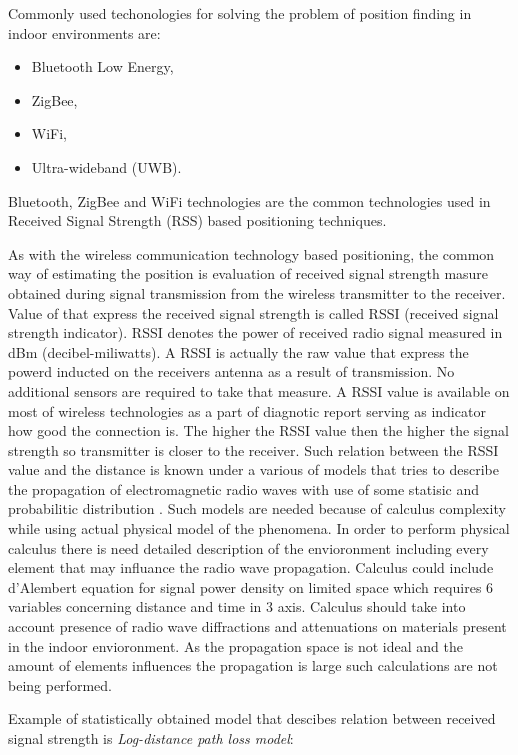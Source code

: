 \documentclass[../main.tex]{subfiles}
\begin{document}
Commonly used techonologies for solving the problem of position finding in indoor environments are\cite{positioning_tests}:
\begin{itemize}
	\item Bluetooth Low Energy,
	\item ZigBee,
	\item WiFi,
	\item Ultra-wideband (UWB).
\end{itemize}

Bluetooth, ZigBee and WiFi technologies are the common technologies used in Received Signal Strength (RSS) based positioning techniques.

As with the wireless communication technology based positioning, the common way of estimating the position is evaluation of received signal strength masure obtained during signal transmission from the wireless transmitter to the receiver. Value of that express the received signal strength is called RSSI (received signal strength indicator). RSSI denotes the power of received radio signal measured in dBm (decibel-miliwatts). A RSSI is actually the raw value that express the powerd inducted on the receivers antenna as a result of transmission. No additional sensors are required to take that measure. A RSSI value is available on most of wireless technologies as a part of diagnotic report serving as indicator how good the connection is. The higher the RSSI value then the higher the signal strength so transmitter is closer to the receiver. Such relation between the RSSI value and the distance is known under a various of models that tries to describe the propagation of electromagnetic radio waves with use of some statisic and probabilitic distribution \cite{RSSI_path_loss_prediction_model}. Such models are needed because of calculus complexity while using actual physical model of the phenomena. In order to perform physical calculus there is need detailed description of the envioronment including every element that may influance the radio wave propagation. Calculus could include d'Alembert equation for signal power density on limited space which requires 6 variables concerning distance and time in 3 axis. Calculus should take into account presence of radio wave diffractions and attenuations on materials present in the indoor envioronment. As the propagation space is not ideal and the amount of elements influences the propagation is large such calculations are not being performed.

Example of statistically obtained model that descibes relation between received signal strength is \textit{Log-distance path loss model}\cite{RSSI_path_loss_prediction_model}:
\end{document}
